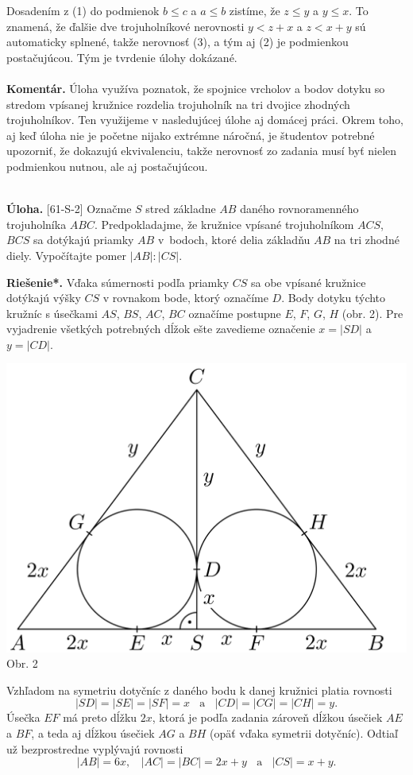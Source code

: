 \documentclass[11pt,a4paper,oneside,final]{book}
\newcommand{\kom}{\textbf{Komentár.} }
\newcommand{\ul}{\textbf{Úloha.} }
\newcommand{\rieh}{\textbf{Riešenie*.} }
\begin{document}
Dosadením z (1) do podmienok $b \leq c$ a $a \leq b$ zistíme, že $z \leq y$ a $y \leq x$. To znamená, že ďalšie dve trojuholníkové nerovnosti $y < z + x$ a $z < x + y$ sú automaticky splnené, takže nerovnosť (3), a tým aj (2) je podmienkou postačujúcou. Tým je tvrdenie úlohy dokázané.\\
\\
\kom Úloha využíva poznatok, že spojnice vrcholov a bodov dotyku so stredom vpísanej kružnice rozdelia trojuholník na tri dvojice zhodných trojuholníkov. Ten využijeme v nasledujúcej úlohe aj domácej práci. Okrem toho, aj keď úloha nie je početne nijako extrémne náročná, je študentov potrebné upozorniť, že dokazujú ekvivalenciu, takže nerovnosť zo zadania musí byť nielen podmienkou nutnou, ale aj postačujúcou.\\
\\
\begin{tcolorbox}[breakable,notitle,boxrule=0pt,colback=light-gray,colframe=light-gray]\ul [61-S-2] Označme $S$ stred základne $AB$ daného rovnoramenného trojuholníka $ABC$. Predpokladajme, že kružnice vpísané trojuholníkom $ACS$, $BCS$ sa dotýkajú priamky $AB$ v~bodoch, ktoré delia základňu $AB$ na tri zhodné diely. Vypočítajte pomer $|AB| : |CS|$.

\end{tcolorbox}

\rieh Vďaka súmernosti podľa priamky $CS$ sa obe vpísané kružnice dotýkajú výšky $CS$ v rovnakom bode, ktorý označíme $D$. Body dotyku týchto kružníc s úsečkami $AS$, $BS$, $AC$, $BC$ označíme postupne $E$, $F$, $G$, $H$ (obr. 2). Pre vyjadrenie všetkých potrebných dĺžok ešte zavedieme označenie $x = |SD|$ a $y = |CD|$.
\begin{center}
\includegraphics[scale=0.3]{61S2}\\

Obr. 2
\end{center}
Vzhľadom na symetriu dotyčníc z daného bodu k danej kružnici platia rovnosti
$$|SD| = |SE| = |SF| = x \ \ \ \ \text{a} \ \ \ \ |CD| = |CG| = |CH| = y.$$
Úsečka $EF$ má preto dĺžku $2x$, ktorá je podľa zadania zároveň dĺžkou úsečiek $AE$ a $BF$, a teda aj dĺžkou úsečiek $AG$ a $BH$ (opäť vďaka symetrii dotyčníc). Odtiaľ už bezprostredne vyplývajú rovnosti
$$|AB| = 6x, \ \ \ \ |AC| = |BC| = 2x + y \ \ \ \ \text{a} \ \ \ \  |CS| = x + y.$$
\end{document}
